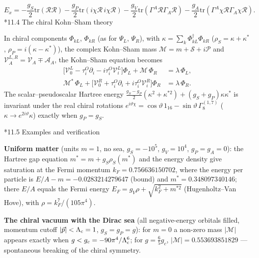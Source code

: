 \documentclass[10pt,a4paper]{article}
\makeatletter
\renewcommand\subsection{\@startsection{subsection}{2}{\z@}{-3.25ex\@plus -1ex \@minus -.2ex}{1.5ex \@plus .2ex}{\normalfont\large\bfseries\raggedright}}
\makeatother
\begin{document}
\begin{equation*}
E_x=-\frac{g_S}2\mathrm{tr}(\mathcal R\mathcal R)-\frac{g_P}2\mathrm{tr}(i\chi\mathcal R\,i\chi\mathcal R)-\frac{g_V}2\mathrm{tr}(\Gamma^{A}\mathcal R\Gamma_{A}\mathcal R)-\frac{g_A}2\mathrm{tr}(\Gamma^{A}\chi\mathcal R\Gamma_{A}\chi\mathcal R).
\end{equation*}
\subsection*{11.4 The chiral Kohn–Sham theory}
In chiral components $\Phi_{kL}$, $\Phi_{kR}$ (as for $\Psi_L$, $\Psi_R$), with $\kappa=\sum_k\Phi_{kL}^\dagger\Phi_{kR}$ ($\rho_S=\kappa+\kappa^*$, $\rho_P=i(\kappa-\kappa^*)$), the complex Kohn–Sham mass $\mathcal M=m+\mathcal S+i\mathcal P$ and $\mathcal V^{L,R}_A=\mathcal V_A\mp\mathcal A_A$, the Kohn–Sham equation becomes
\begin{align*}
\big[\mathcal V^L_0-\tau^{O}_i\partial_i-i\tau^{O}_i\mathcal V^L_i\big]\Phi_L+\mathcal M\,\Phi_R&=\lambda\,\Phi_L, \\
\mathcal M^*\,\Phi_L+\big[\mathcal V^R_0+\tau^{O}_i\partial_i+i\tau^{O}_i\mathcal V^R_i\big]\Phi_R&=\lambda\,\Phi_R .
\end{align*}
The scalar–pseudoscalar Hartree energy $\frac{g_S-g_P}2(\kappa^2+\kappa^{*2})+(g_S+g_P)\kappa\kappa^*$ is invariant under the real chiral rotations $e^{i\vartheta\chi}=\cos\vartheta\,1_{16}-\sin\vartheta\,\Gamma^{(1,7)}_8$ ($\kappa\to e^{2i\vartheta}\kappa$) exactly when $g_P=g_S$.

\subsection*{11.5 Examples and verification}
\textbf{Uniform matter} (units $m=1$, no sea, $g_S=-10^5$, $g_V=10^4$, $g_P=g_A=0$): the Hartree gap equation $m^*=m+g_S\rho_S(m^*)$ and the energy density give saturation at the Fermi momentum $k_F=0.756636150702$, where the energy per particle is $E/A-m=-0.0283214279647$ (bound) and $m^*=0.348097340146$; there $E/A$ equals the Fermi energy $E_F=g_V\rho+\sqrt{k_F^2+m^{*2}}$ (Hugenholtz–Van Hove), with $\rho=k_F^7/(105\pi^4)$.

\textbf{The chiral vacuum with the Dirac sea} (all negative-energy orbitals filled, momentum cutoff $|\vec p|<\Lambda_{\rm c}=1$, $g_S=g_P=g$): for $m=0$ a non-zero mass $|\mathcal M|$ appears exactly when $g<g_c=-90\pi^4/\Lambda_{\rm c}^6$; for $g=\frac65g_c$, $|\mathcal M|=0.553693851829$ — spontaneous breaking of the chiral symmetry.
\end{document}
